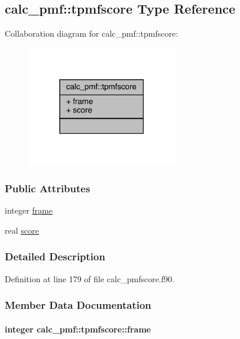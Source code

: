 \hypertarget{structcalc__pmf_1_1tpmfscore}{\subsection{calc\-\_\-pmf\-:\-:tpmfscore Type Reference}
\label{structcalc__pmf_1_1tpmfscore}
}


Collaboration diagram for calc\-\_\-pmf\-:\-:tpmfscore\-:
\nopagebreak
\begin{figure}[H]
\begin{center}
\leavevmode
\includegraphics[width=186pt]{structcalc__pmf_1_1tpmfscore__coll__graph}
\end{center}
\end{figure}
\subsubsection*{Public Attributes}
\begin{DoxyCompactItemize}
\item 
integer \hyperlink{structcalc__pmf_1_1tpmfscore_aee25cae7a670ebdd5beb6ef2b00bd04a}{frame}
\item 
real \hyperlink{structcalc__pmf_1_1tpmfscore_a08b2a410e79c5b5e2d3366ff09e1fa55}{score}
\end{DoxyCompactItemize}


\subsubsection{Detailed Description}


Definition at line 179 of file calc\-\_\-pmfscore.\-f90.



\subsubsection{Member Data Documentation}
\hypertarget{structcalc__pmf_1_1tpmfscore_aee25cae7a670ebdd5beb6ef2b00bd04a}{
\paragraph[{frame}]{\setlength{\rightskip}{0pt plus 5cm}integer calc\-\_\-pmf\-::tpmfscore\-::frame}}\label{structcalc__pmf_1_1tpmfscore_aee25cae7a670ebdd5beb6ef2b00bd04a}


